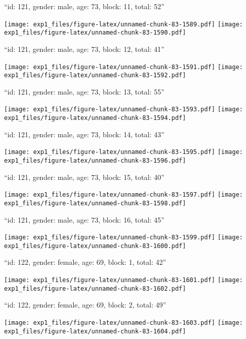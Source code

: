 \documentclass[11pt,,]{article}
\begin{document}
\newpage
[1] 

``id: 121, gender: male, age: 73, block: 11, total: 52''

\texttt{[image: exp1\_files/figure-latex/unnamed-chunk-83-1589.pdf]}
\texttt{[image: exp1\_files/figure-latex/unnamed-chunk-83-1590.pdf]}

\newpage
[1] 

``id: 121, gender: male, age: 73, block: 12, total: 41''

\texttt{[image: exp1\_files/figure-latex/unnamed-chunk-83-1591.pdf]}
\texttt{[image: exp1\_files/figure-latex/unnamed-chunk-83-1592.pdf]}

\newpage
[1] 

``id: 121, gender: male, age: 73, block: 13, total: 55''

\texttt{[image: exp1\_files/figure-latex/unnamed-chunk-83-1593.pdf]}
\texttt{[image: exp1\_files/figure-latex/unnamed-chunk-83-1594.pdf]}

\newpage
[1] 

``id: 121, gender: male, age: 73, block: 14, total: 43''

\texttt{[image: exp1\_files/figure-latex/unnamed-chunk-83-1595.pdf]}
\texttt{[image: exp1\_files/figure-latex/unnamed-chunk-83-1596.pdf]}

\newpage
[1] 

``id: 121, gender: male, age: 73, block: 15, total: 40''

\texttt{[image: exp1\_files/figure-latex/unnamed-chunk-83-1597.pdf]}
\texttt{[image: exp1\_files/figure-latex/unnamed-chunk-83-1598.pdf]}

\newpage
[1] 

``id: 121, gender: male, age: 73, block: 16, total: 45''

\texttt{[image: exp1\_files/figure-latex/unnamed-chunk-83-1599.pdf]}
\texttt{[image: exp1\_files/figure-latex/unnamed-chunk-83-1600.pdf]}

\newpage
[1] 

``id: 122, gender: female, age: 69, block: 1, total: 42''

\texttt{[image: exp1\_files/figure-latex/unnamed-chunk-83-1601.pdf]}
\texttt{[image: exp1\_files/figure-latex/unnamed-chunk-83-1602.pdf]}

\newpage
[1] 

``id: 122, gender: female, age: 69, block: 2, total: 49''

\texttt{[image: exp1\_files/figure-latex/unnamed-chunk-83-1603.pdf]}
\texttt{[image: exp1\_files/figure-latex/unnamed-chunk-83-1604.pdf]}
\end{document}
